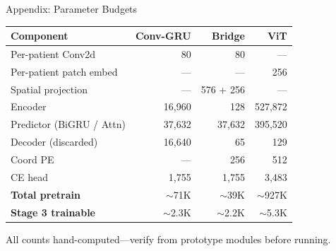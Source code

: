 \documentclass[aspectratio=169, 11pt]{beamer}
\begin{document}
\begin{frame}[noframenumbering]{Appendix: Parameter Budgets}

\centering
\small
\renewcommand{\arraystretch}{1.1}
\begin{tabular}{@{}l r r r@{}}
  \toprule
  \textbf{Component} & \textbf{Conv-GRU} & \textbf{Bridge} & \textbf{ViT} \\
  \midrule
  Per-patient Conv2d       & 80 & 80 & --- \\
  Per-patient patch embed  & --- & --- & 256 \\
  Spatial projection       & --- & 576 + 256 & --- \\
  Encoder                  & 16,960 & 128 & 527,872 \\
  Predictor (BiGRU / Attn) & 37,632 & 37,632 & 395,520 \\
  Decoder (discarded)      & 16,640 & 65 & 129 \\
  Coord PE                 & --- & 256 & 512 \\
  CE head                  & 1,755 & 1,755 & 3,483 \\
  \midrule
  \textbf{Total pretrain}  & $\sim$71K & $\sim$39K & $\sim$927K \\
  \textbf{Stage 3 trainable} & $\sim$2.3K & $\sim$2.2K & $\sim$5.3K \\
  \bottomrule
\end{tabular}

\vspace{0.5em}
{\footnotesize All counts hand-computed---verify from prototype modules before running.}
\end{frame}

\end{document}
